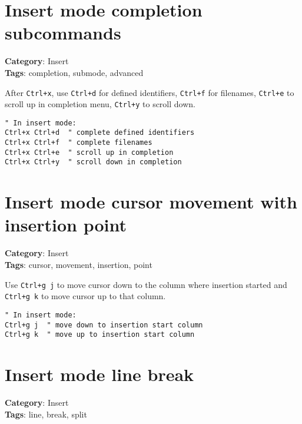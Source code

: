 {{{{{\section{Insert mode completion subcommands}

\textbf{Category}: Insert\\ \textbf{Tags}: completion, submode, advanced
\vspace{0.5cm}

After {\footnotesize \Verb§Ctrl+x§}, use {\footnotesize \Verb§Ctrl+d§} for defined identifiers, {\footnotesize \Verb§Ctrl+f§} for filenames, {\footnotesize \Verb§Ctrl+e§} to scroll up in completion menu, {\footnotesize \Verb§Ctrl+y§} to scroll down.

\begin{Exa*}{}
\begin{Verbatim}[fontsize=\footnotesize, breaklines, breakanywhere]
" In insert mode:
Ctrl+x Ctrl+d  " complete defined identifiers  
Ctrl+x Ctrl+f  " complete filenames
Ctrl+x Ctrl+e  " scroll up in completion
Ctrl+x Ctrl+y  " scroll down in completion
\end{Verbatim}
\end{Exa*}

\section{Insert mode cursor movement with insertion point}

\textbf{Category}: Insert\\ \textbf{Tags}: cursor, movement, insertion, point
\vspace{0.5cm}

Use {\footnotesize \Verb§Ctrl+g j§} to move cursor down to the column where insertion started and {\footnotesize \Verb§Ctrl+g k§} to move cursor up to that column.

\begin{Exa*}{}
\begin{Verbatim}[fontsize=\footnotesize, breaklines, breakanywhere]
" In insert mode:
Ctrl+g j  " move down to insertion start column
Ctrl+g k  " move up to insertion start column
\end{Verbatim}
\end{Exa*}

\section{Insert mode line break}

\textbf{Category}: Insert\\ \textbf{Tags}: line, break, split
\vspace{0.5cm}

}}}}}
